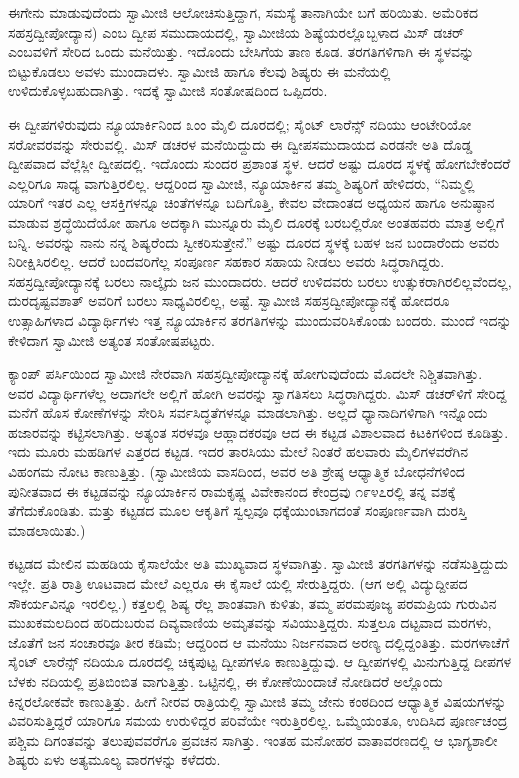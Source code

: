 ಈಗೇನು ಮಾಡುವುದೆಂದು ಸ್ವಾಮೀಜಿ ಆಲೋಚಿಸುತ್ತಿದ್ದಾಗ, ಸಮಸ್ಯೆ ತಾನಾಗಿಯೇ ಬಗೆ ಹರಿಯಿತು. ಅಮೆರಿಕದ ಸಹಸ್ರದ್ವೀಪೋದ್ಯಾನ) ಎಂಬ ದ್ವೀಪ ಸಮುದಾಯದಲ್ಲಿ, ಸ್ವಾಮೀಜಿಯ ಶಿಷ್ಯೆಯರಲ್ಲೊಬ್ಬಳಾದ ಮಿಸ್ ಡಚರ್ ಎಂಬವಳಿಗೆ ಸೇರಿದ ಒಂದು ಮನೆಯಿತ್ತು. ಇದೊಂದು ಬೇಸಿಗೆಯ ತಾಣ ಕೂಡ. ತರಗತಿಗಳಿಗಾಗಿ ಈ ಸ್ಥಳವನ್ನು ಬಿಟ್ಟುಕೊಡಲು ಅವಳು ಮುಂದಾದಳು. ಸ್ವಾಮೀಜಿ ಹಾಗೂ ಕೆಲವು ಶಿಷ್ಯರು ಈ ಮನೆಯಲ್ಲಿ ಉಳಿದುಕೊಳ್ಳಬಹುದಾಗಿತ್ತು. ಇದಕ್ಕೆ ಸ್ವಾಮೀಜಿ ಸಂತೋಷದಿಂದ ಒಪ್ಪಿದರು.

ಈ ದ್ವೀಪಗಳಿರುವುದು ನ್ಯೂಯಾರ್ಕಿನಿಂದ ೩ಂಂ ಮೈಲಿ ದೂರದಲ್ಲಿ; ಸೈಂಟ್ ಲಾರೆನ್ಸ್ ನದಿಯು ಆಂಟೇರಿಯೋ ಸರೋವರವನ್ನು ಸೇರುವಲ್ಲಿ. ಮಿಸ್ ಡಚರಳ ಮನೆಯಿದ್ದುದು ಈ ದ್ವೀಪಸಮುದಾಯದ ಎರಡನೇ ಅತಿ ದೊಡ್ಡ ದ್ವೀಪವಾದ ವೆಲ್ಲೆಸ್ಲೀ ದ್ವೀಪದಲ್ಲಿ. ಇದೊಂದು ಸುಂದರ ಪ್ರಶಾಂತ ಸ್ಥಳ. ಆದರೆ ಅಷ್ಟು ದೂರದ ಸ್ಥಳಕ್ಕೆ ಹೋಗಬೇಕೆಂದರೆ ಎಲ್ಲರಿಗೂ ಸಾಧ್ಯ ವಾಗುತ್ತಿರಲಿಲ್ಲ. ಆದ್ದರಿಂದ ಸ್ವಾಮೀಜಿ, ನ್ಯೂಯಾರ್ಕಿನ ತಮ್ಮ ಶಿಷ್ಯರಿಗೆ ಹೇಳಿದರು, “ನಿಮ್ಮಲ್ಲಿ ಯಾರಿಗೆ ಇತರ ಎಲ್ಲ ಆಸಕ್ತಿಗಳನ್ನೂ ಚಿಂತೆಗಳನ್ನೂ ಬದಿಗೊತ್ತಿ, ಕೇವಲ ವೇದಾಂತದ ಅಧ್ಯಯನ ಹಾಗೂ ಅನುಷ್ಠಾನ ಮಾಡುವ ಶ್ರದ್ಧೆಯಿದೆಯೋ ಹಾಗೂ ಅದಕ್ಕಾಗಿ ಮುನ್ನೂರು ಮೈಲಿ ದೂರಕ್ಕೆ ಬರಬಲ್ಲಿರೋ ಅಂತಹವರು ಮಾತ್ರ ಅಲ್ಲಿಗೆ ಬನ್ನಿ. ಅವರನ್ನು ನಾನು ನನ್ನ ಶಿಷ್ಯರೆಂದು ಸ್ವೀಕರಿಸುತ್ತೇನೆ.” ಅಷ್ಟು ದೂರದ ಸ್ಥಳಕ್ಕೆ ಬಹಳ ಜನ ಬಂದಾರೆಂದು ಅವರು ನಿರೀಕ್ಷಿಸಿರಲಿಲ್ಲ. ಆದರೆ ಬಂದವರಿಗೆಲ್ಲ ಸಂಪೂರ್ಣ ಸಹಕಾರ ಸಹಾಯ ನೀಡಲು ಅವರು ಸಿದ್ಧರಾಗಿದ್ದರು. ಸಹಸ್ರದ್ವೀಪೋದ್ಯಾನಕ್ಕೆ ಬರಲು ನಾಲ್ಕೈದು ಜನ ಮುಂದಾದರು. ಆದರೆ ಉಳಿದವರು ಬರಲು ಉತ್ಸುಕರಾಗಿರಲಿಲ್ಲವೆಂದಲ್ಲ, ದುರದೃಷ್ಟವಶಾತ್ ಅವರಿಗೆ ಬರಲು ಸಾಧ್ಯವಿರಲಿಲ್ಲ, ಅಷ್ಟೆ. ಸ್ವಾಮೀಜಿ ಸಹಸ್ರದ್ವೀಪೋದ್ಯಾನಕ್ಕೆ ಹೋದರೂ ಉತ್ಸಾಹಿಗಳಾದ ವಿದ್ಯಾರ್ಥಿಗಳು ಇತ್ತ ನ್ಯೂಯಾರ್ಕಿನ ತರಗತಿಗಳನ್ನು ಮುಂದುವರಿಸಿಕೊಂಡು ಬಂದರು. ಮುಂದೆ ಇದನ್ನು ಕೇಳಿದಾಗ ಸ್ವಾಮೀಜಿ ಅತ್ಯಂತ ಸಂತೋಷಪಟ್ಟರು.

ಕ್ಯಾಂಪ್ ಪರ್ಸಿಯಿಂದ ಸ್ವಾಮೀಜಿ ನೇರವಾಗಿ ಸಹಸ್ರದ್ವೀಪೋದ್ಯಾನಕ್ಕೆ ಹೋಗುವುದೆಂದು ಮೊದಲೇ ನಿಶ್ಚಿತವಾಗಿತ್ತು. ಅವರ ವಿದ್ಯಾರ್ಥಿಗಳೆಲ್ಲ ಅದಾಗಲೇ ಅಲ್ಲಿಗೆ ಹೋಗಿ ಅವರನ್ನು ಸ್ವಾಗತಿಸಲು ಸಿದ್ಧರಾಗಿದ್ದರು. ಮಿಸ್ ಡಚರ್​ಳಿಗೆ ಸೇರಿದ್ದ ಮನೆಗೆ ಹೊಸ ಕೋಣೆಗಳನ್ನು ಸೇರಿಸಿ ಸರ್ವಸಿದ್ಧತೆಗಳನ್ನೂ ಮಾಡಲಾಗಿತ್ತು. ಅಲ್ಲದೆ ಧ್ಯಾನಾದಿಗಳಿಗಾಗಿ ಇನ್ನೊಂದು ಹಜಾರವನ್ನು ಕಟ್ಟಿಸಲಾಗಿತ್ತು. ಅತ್ಯಂತ ಸರಳವೂ ಆಹ್ಲಾದಕರವೂ ಆದ ಈ ಕಟ್ಟಡ ವಿಶಾಲವಾದ ಕಿಟಕಿಗಳಿಂದ ಕೂಡಿತ್ತು. ಇದು ಮೂರು ಮಹಡಿಗಳ ಎತ್ತರದ ಕಟ್ಟಡ. ಇದರ ತಾರಸಿಯು ಮೇಲೆ ನಿಂತರೆ ಹಲವಾರು ಮೈಲಿಗಳವರೆಗಿನ ವಿಹಂಗಮ ನೋಟ ಕಾಣುತ್ತಿತ್ತು. (ಸ್ವಾಮೀಜಿಯ ವಾಸದಿಂದ, ಅವರ ಅತಿ ಶ್ರೇಷ್ಠ ಆಧ್ಯಾತ್ಮಿಕ ಬೋಧನೆಗಳಿಂದ ಪುನೀತವಾದ ಈ ಕಟ್ಟಡವನ್ನು ನ್ಯೂಯಾರ್ಕಿನ ರಾಮಕೃಷ್ಣ ವಿವೇಕಾನಂದ ಕೇಂದ್ರವು ೧೯೪೭ರಲ್ಲಿ ತನ್ನ ವಶಕ್ಕೆ ತೆಗೆದುಕೊಂಡಿತು. ಮತ್ತು ಕಟ್ಟಡದ ಮೂಲ ಆಕೃತಿಗೆ ಸ್ವಲ್ಪವೂ ಧಕ್ಕೆಯುಂಟಾಗದಂತೆ ಸಂಪೂರ್ಣವಾಗಿ ದುರಸ್ತಿ ಮಾಡಲಾಯಿತು.)

ಕಟ್ಟಡದ ಮೇಲಿನ ಮಹಡಿಯ ಕೈಸಾಲೆಯೇ ಅತಿ ಮುಖ್ಯವಾದ ಸ್ಥಳವಾಗಿತ್ತು. ಸ್ವಾಮೀಜಿ ತರಗತಿಗಳನ್ನು ನಡೆಸುತ್ತಿದ್ದುದು ಇಲ್ಲೇ. ಪ್ರತಿ ರಾತ್ರಿ ಊಟವಾದ ಮೇಲೆ ಎಲ್ಲರೂ ಈ ಕೈಸಾಲೆ ಯಲ್ಲಿ ಸೇರುತ್ತಿದ್ದರು. (ಆಗ ಅಲ್ಲಿ ವಿದ್ಯುದ್ದೀಪದ ಸೌಕರ್ಯವಿನ್ನೂ ಇರಲಿಲ್ಲ.) ಕತ್ತಲಲ್ಲಿ ಶಿಷ್ಯ ರೆಲ್ಲ ಶಾಂತವಾಗಿ ಕುಳಿತು, ತಮ್ಮ ಪರಮಪೂಜ್ಯ ಪರಮಪ್ರಿಯ ಗುರುವಿನ ಮುಖಕಮಲದಿಂದ ಹರಿದುಬರುವ ದಿವ್ಯವಾಣಿಯ ಅಮೃತವನ್ನು ಸವಿಯುತ್ತಿದ್ದರು. ಸುತ್ತಲೂ ದಟ್ಟವಾದ ಮರಗಳು, ಜೊತೆಗೆ ಜನ ಸಂಚಾರವೂ ತೀರ ಕಡಿಮೆ; ಆದ್ದರಿಂದ ಆ ಮನೆಯು ನಿರ್ಜನವಾದ ಅರಣ್ಯ ದಲ್ಲಿದ್ದಂತಿತ್ತು. ಮರಗಳಾಚೆಗೆ ಸೈಂಟ್ ಲಾರೆನ್ಸ್ ನದಿಯೂ ದೂರದಲ್ಲಿ ಚಿಕ್ಕಪುಟ್ಟ ದ್ವೀಪಗಳೂ ಕಾಣುತ್ತಿದ್ದುವು. ಆ ದ್ವೀಪಗಳಲ್ಲಿ ಮಿನುಗುತ್ತಿದ್ದ ದೀಪಗಳ ಬೆಳಕು ನದಿಯಲ್ಲಿ ಪ್ರತಿಬಿಂಬಿತ ವಾಗುತ್ತಿತ್ತು. ಒಟ್ಟಿನಲ್ಲಿ, ಈ ಕೋಣೆಯಿಂದಾಚೆ ನೋಡಿದರೆ ಅಲ್ಲೊಂದು ಕಿನ್ನರಲೋಕವೇ ಕಾಣುತ್ತಿತ್ತು. ಹೀಗೆ ನೀರವ ರಾತ್ರಿಯಲ್ಲಿ ಸ್ವಾಮೀಜಿ ತಮ್ಮ ಜೇನು ಕಂಠದಿಂದ ಆಧ್ಯಾತ್ಮಿಕ ವಿಷಯಗಳನ್ನು ವಿವರಿಸುತ್ತಿದ್ದರೆ ಯಾರಿಗೂ ಸಮಯ ಉರುಳಿದ್ದರ ಪರಿವೆಯೇ ಇರುತ್ತಿರಲಿಲ್ಲ. ಒಮ್ಮೆಯಂತೂ, ಉದಿಸಿದ ಪೂರ್ಣಚಂದ್ರ ಪಶ್ಚಿಮ ದಿಗಂತವನ್ನು ತಲುಪುವವರೆಗೂ ಪ್ರವಚನ ಸಾಗಿತ್ತು. ಇಂತಹ ಮನೋಹರ ವಾತಾವರಣದಲ್ಲಿ ಆ ಭಾಗ್ಯಶಾಲೀ ಶಿಷ್ಯರು ಏಳು ಅತ್ಯಮೂಲ್ಯ ವಾರಗಳನ್ನು ಕಳೆದರು.

